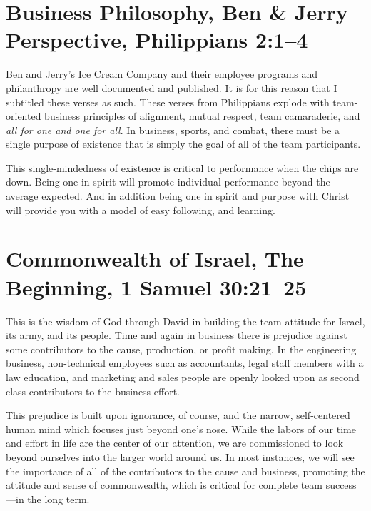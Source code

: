 \documentclass[12pt]{memoir}
\begin{document}
\section[Business Philosophy, Ben \& Jerry Perspective]{Business Philosophy, Ben \& Jerry Perspective, Philippians 2:1--4}

Ben and Jerry's Ice Cream Company and their employee programs and
philanthropy are well documented and published. It is for this reason
that I subtitled these verses as such. These verses from Philippians
explode with team-oriented business principles of alignment, mutual respect, team camaraderie, and \emph{all for one and one for all}.
In business, sports, and combat, there must be a single purpose of
existence that is simply the goal of all of the team participants.

This single-mindedness of existence is critical to performance when
the chips are down. Being one in spirit will promote individual
performance beyond the average expected. And in addition being
one in spirit and purpose with Christ will provide you with a model
of easy following, and learning.

\section[Commonwealth of Israel, The Beginning]{Commonwealth of Israel, The Beginning, 1 Samuel 30:21--25}

This is the wisdom of God through David in building the team attitude for Israel, its army, and its people. Time and again in business there is prejudice against some contributors to the cause, production,
or profit making. In the engineering business, non-technical employees
such as accountants, legal staff members with a law education, and
marketing and sales people are openly looked upon as second class
contributors to the business effort.

This prejudice is built upon ignorance, of course, and the narrow,
self-centered human mind which focuses just beyond one's nose. While
the labors of our time and effort in life are the center of our attention,
we are commissioned to look beyond ourselves into the larger world
around us. In most instances, we will see the importance of all of
the contributors to the cause and business, promoting the attitude
and sense of commonwealth, which is critical for complete team success---in
the long term.
\end{document}
